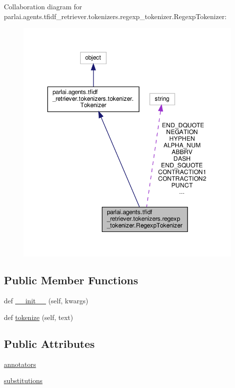 Collaboration diagram for parlai.\+agents.\+tfidf\+\_\+retriever.\+tokenizers.\+regexp\+\_\+tokenizer.\+Regexp\+Tokenizer\+:
\nopagebreak
\begin{figure}[H]
\begin{center}
\leavevmode
\includegraphics[width=343pt]{classparlai_1_1agents_1_1tfidf__retriever_1_1tokenizers_1_1regexp__tokenizer_1_1RegexpTokenizer__coll__graph}
\end{center}
\end{figure}
\subsection*{Public Member Functions}
\begin{DoxyCompactItemize}
\item 
def \hyperlink{classparlai_1_1agents_1_1tfidf__retriever_1_1tokenizers_1_1regexp__tokenizer_1_1RegexpTokenizer_af18fd6e3cb635cf6a05f32b90fb51fcc}{\+\_\+\+\_\+init\+\_\+\+\_\+} (self, kwargs)
\item 
def \hyperlink{classparlai_1_1agents_1_1tfidf__retriever_1_1tokenizers_1_1regexp__tokenizer_1_1RegexpTokenizer_aed53e2811a6c13818061b300311fde1a}{tokenize} (self, text)
\end{DoxyCompactItemize}
\subsection*{Public Attributes}
\begin{DoxyCompactItemize}
\item 
\hyperlink{classparlai_1_1agents_1_1tfidf__retriever_1_1tokenizers_1_1regexp__tokenizer_1_1RegexpTokenizer_ae51dae33c902220b106a5537c07f02bc}{annotators}
\item 
\hyperlink{classparlai_1_1agents_1_1tfidf__retriever_1_1tokenizers_1_1regexp__tokenizer_1_1RegexpTokenizer_a59668153f48d9c70ab5b07f2f9a79d7f}{substitutions}
\end{DoxyCompactItemize}
